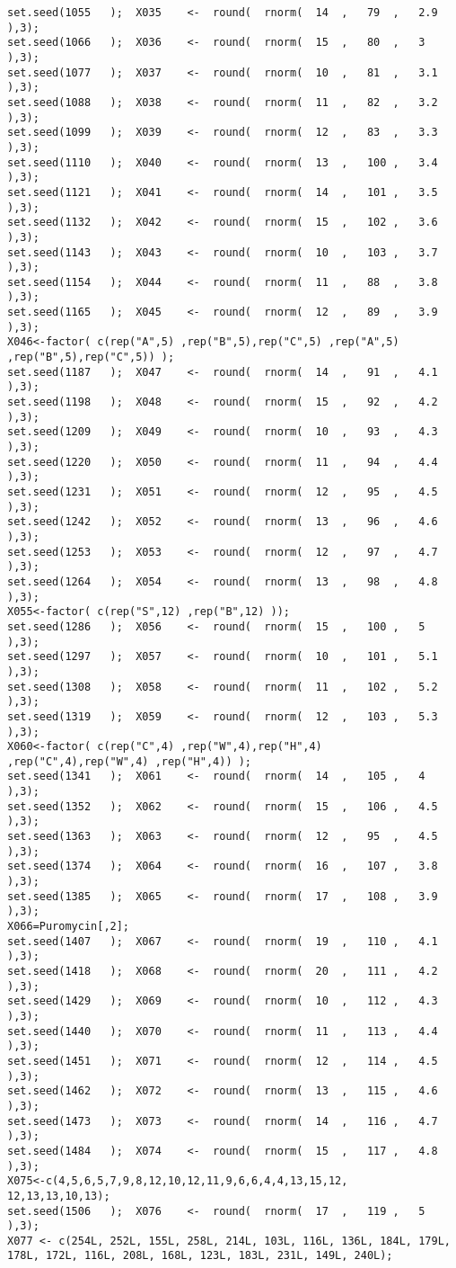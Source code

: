 \documentclass[a4paper,12pt]{article}
\begin{document}
\begin{verbatim}
set.seed(1055	);	X035	<-	round(	rnorm(	14	,	79	,	2.9	),3);
set.seed(1066	);	X036	<-	round(	rnorm(	15	,	80	,	3	),3);
set.seed(1077	);	X037	<-	round(	rnorm(	10	,	81	,	3.1	),3);
set.seed(1088	);	X038	<-	round(	rnorm(	11	,	82	,	3.2	),3);
set.seed(1099	);	X039	<-	round(	rnorm(	12	,	83	,	3.3	),3);
set.seed(1110	);	X040	<-	round(	rnorm(	13	,	100	,	3.4	),3);
set.seed(1121	);	X041	<-	round(	rnorm(	14	,	101	,	3.5	),3);
set.seed(1132	);	X042	<-	round(	rnorm(	15	,	102	,	3.6	),3);
set.seed(1143	);	X043	<-	round(	rnorm(	10	,	103	,	3.7	),3);
set.seed(1154	);	X044	<-	round(	rnorm(	11	,	88	,	3.8	),3);
set.seed(1165	);	X045	<-	round(	rnorm(	12	,	89	,	3.9	),3);
X046<-factor( c(rep("A",5) ,rep("B",5),rep("C",5) ,rep("A",5) ,rep("B",5),rep("C",5)) );
set.seed(1187	);	X047	<-	round(	rnorm(	14	,	91	,	4.1	),3);
set.seed(1198	);	X048	<-	round(	rnorm(	15	,	92	,	4.2	),3);
set.seed(1209	);	X049	<-	round(	rnorm(	10	,	93	,	4.3	),3);
set.seed(1220	);	X050	<-	round(	rnorm(	11	,	94	,	4.4	),3);
set.seed(1231	);	X051	<-	round(	rnorm(	12	,	95	,	4.5	),3);
set.seed(1242	);	X052	<-	round(	rnorm(	13	,	96	,	4.6	),3);
set.seed(1253	);	X053	<-	round(	rnorm(	12	,	97	,	4.7	),3);
set.seed(1264	);	X054	<-	round(	rnorm(	13	,	98	,	4.8	),3);
X055<-factor( c(rep("S",12) ,rep("B",12) ));
set.seed(1286	);	X056	<-	round(	rnorm(	15	,	100	,	5	),3);
set.seed(1297	);	X057	<-	round(	rnorm(	10	,	101	,	5.1	),3);
set.seed(1308	);	X058	<-	round(	rnorm(	11	,	102	,	5.2	),3);
set.seed(1319	);	X059	<-	round(	rnorm(	12	,	103	,	5.3	),3);
X060<-factor( c(rep("C",4) ,rep("W",4),rep("H",4) ,rep("C",4),rep("W",4) ,rep("H",4)) );
set.seed(1341	);	X061	<-	round(	rnorm(	14	,	105	,	4	),3);
set.seed(1352	);	X062	<-	round(	rnorm(	15	,	106	,	4.5	),3);
set.seed(1363	);	X063	<-	round(	rnorm(	12	,	95	,	4.5	),3);
set.seed(1374	);	X064	<-	round(	rnorm(	16	,	107	,	3.8	),3);
set.seed(1385	);	X065	<-	round(	rnorm(	17	,	108	,	3.9	),3);
X066=Puromycin[,2];
set.seed(1407	);	X067	<-	round(	rnorm(	19	,	110	,	4.1	),3);
set.seed(1418	);	X068	<-	round(	rnorm(	20	,	111	,	4.2	),3);
set.seed(1429	);	X069	<-	round(	rnorm(	10	,	112	,	4.3	),3);
set.seed(1440	);	X070	<-	round(	rnorm(	11	,	113	,	4.4	),3);
set.seed(1451	);	X071	<-	round(	rnorm(	12	,	114	,	4.5	),3);
set.seed(1462	);	X072	<-	round(	rnorm(	13	,	115	,	4.6	),3);
set.seed(1473	);	X073	<-	round(	rnorm(	14	,	116	,	4.7	),3);
set.seed(1484	);	X074	<-	round(	rnorm(	15	,	117	,	4.8	),3);
X075<-c(4,5,6,5,7,9,8,12,10,12,11,9,6,6,4,4,13,15,12,
12,13,13,10,13);
set.seed(1506	);	X076	<-	round(	rnorm(	17	,	119	,	5	),3);
X077 <- c(254L, 252L, 155L, 258L, 214L, 103L, 116L, 136L, 184L, 179L, 
178L, 172L, 116L, 208L, 168L, 123L, 183L, 231L, 149L, 240L);

\end{verbatim}
\end{document}
